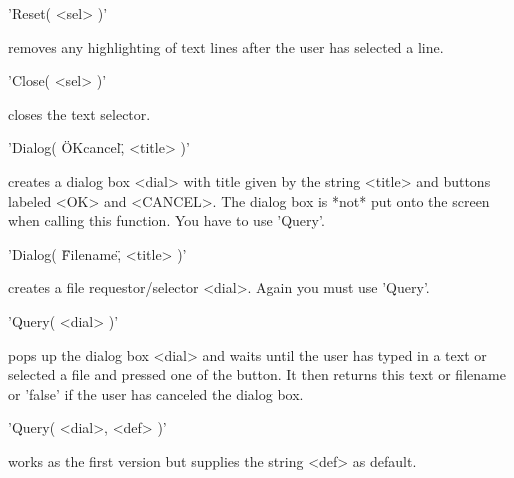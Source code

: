'Reset( <sel> )'

removes any highlighting of   text lines after   the user has  selected a
line.

'Close( <sel> )'

closes the text selector.



'Dialog( \"OKcancel\", <title> )'

creates  a dialog box <dial>  with title given  by the string <title> and
buttons labeled <OK> and <CANCEL>.  The dialog box  is *not* put onto the
screen when calling this function.  You have to use 'Query'.

'Dialog( \"Filename\", <title> )'

creates a file requestor/selector <dial>. Again you must use 'Query'.

'Query( <dial> )'

pops up the  dialog box <dial>  and waits until the user  has  typed in a
text or selected a file  and pressed one of the  button.  It then returns
this text or filename or 'false' if the user has canceled the dialog box.

'Query( <dial>, <def> )'

works as the first version but supplies the string <def> as default.

